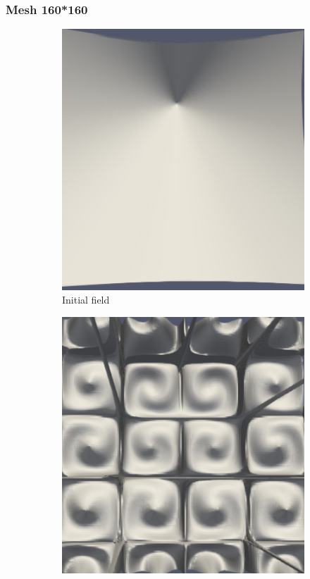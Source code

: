 \documentclass{article}
\begin{document}
\subsubsection{Mesh 160*160}
\begin{figure}[hbt!]
  \begin{subfigure}{0.4\textwidth}
        \centering
        \includegraphics[width=\textwidth]{Figures/5e-5 160x160/for n 1.png}
        \caption{Initial field}
  \end{subfigure}
  \hfill
  \begin{subfigure}{0.4\textwidth}
        \centering
        \includegraphics[width=\textwidth]{Figures/5e-5 160x160/for n 20.png}

\end{subfigure}
\end{figure}
\end{document}
